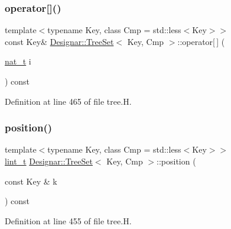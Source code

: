 \subsubsection{\texorpdfstring{operator[]()}{operator[]()}\hspace{0.1cm}{\footnotesize\ttfamily [2/2]}}
{\footnotesize\ttfamily template$<$typename Key, class Cmp = std\+::less$<$\+Key$>$$>$ \\
const Key\& \hyperlink{class_designar_1_1_tree_set}{Designar\+::\+Tree\+Set}$<$ Key, Cmp $>$\+::operator\mbox{[}$\,$\mbox{]} (\begin{DoxyParamCaption}\item[{\hyperlink{namespace_designar_aa72662848b9f4815e7bf31a7cf3e33d1}{nat\+\_\+t}}]{i }\end{DoxyParamCaption}) const\hspace{0.3cm}{\ttfamily [inline]}}



Definition at line 465 of file tree.\+H.

\mbox{\label{class_designar_1_1_tree_set_a3d10471f0d45ebbf63904fcb57f0ef5d}} 
\subsubsection{\texorpdfstring{position()}{position()}}
{\footnotesize\ttfamily template$<$typename Key, class Cmp = std\+::less$<$\+Key$>$$>$ \\
\hyperlink{namespace_designar_a9d113d66a39e82b73727c72cd3a52f73}{lint\+\_\+t} \hyperlink{class_designar_1_1_tree_set}{Designar\+::\+Tree\+Set}$<$ Key, Cmp $>$\+::position (\begin{DoxyParamCaption}\item[{const Key \&}]{k }\end{DoxyParamCaption}) const\hspace{0.3cm}{\ttfamily [inline]}}



Definition at line 455 of file tree.\+H.

\mbox{\label{class_designar_1_1_tree_set_aa0a8a4c41fe3c495759d555f2de08661}} 
